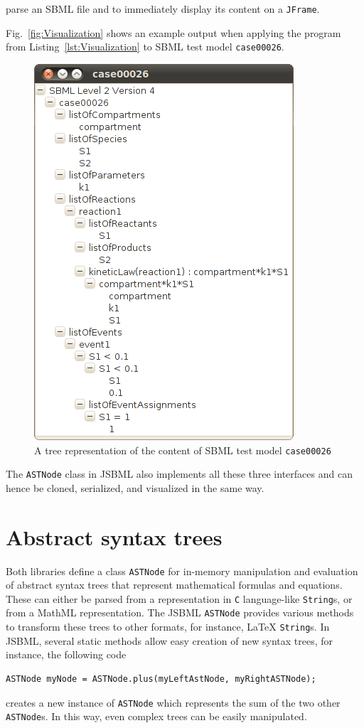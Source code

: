 \documentclass[
  BCOR12mm,
  letterpaper,
  11pt,
  headsepline,
  pointlessnumbers,
  tablecaptionabove,
  headinclude,
  appendixprefix,
  idxtotoc,
  bibtotoc,
  twoside,
  titlepage
]{scrartcl}
\begin{document}
parse an SBML file and to immediately display its content on a \verb!JFrame!.

Fig.~\vref{fig:Visualization} shows an example output when applying the program
from Listing~\vref{lst:Visualization} to SBML test model \texttt{case00026}.
\begin{figure}
\includegraphics[width=.35\textwidth]{posters/2010_ICSB_and_COMBINE/JSBMLvisualizerTransparent}
\caption[Tree representation of an SBML file]{A tree representation of the
content of SBML test model \texttt{case00026}}
\label{fig:Visualization}
\end{figure}
The \verb!ASTNode! class in JSBML also implements all these three interfaces and
can hence be cloned, serialized, and visualized in the same way.


\section{Abstract syntax trees}

Both libraries define a class \verb!ASTNode! for in-memory manipulation and
evaluation of abstract syntax trees that represent mathematical formulas and
equations. These can either be parsed from a representation in \verb!C!
language-like \verb!String!s, or from a MathML representation. The JSBML
\verb!ASTNode! provides various methods to transform these trees to other
formats, for instance, \LaTeX{} \verb!String!s. In JSBML, several static methods
allow easy creation of new syntax trees, for instance, the following code
\begin{verbatim}
ASTNode myNode = ASTNode.plus(myLeftAstNode, myRightASTNode);
\end{verbatim}
creates a new instance of \verb!ASTNode! which represents the sum of the two
other \verb!ASTNode!s. In this way, even complex trees can be easily
manipulated.
\end{document}
